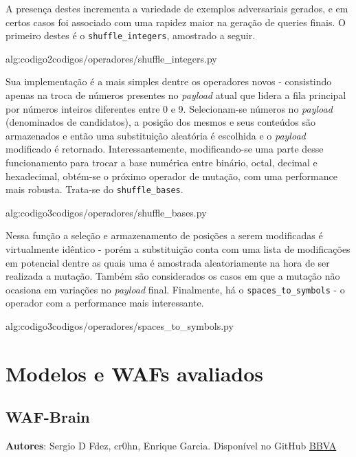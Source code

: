 A presença destes incrementa a variedade de exemplos adversariais gerados, e em certos casos foi associado com uma rapidez maior na geração de queries finais. O primeiro destes é o \verb+shuffle_integers+, amostrado a seguir.

\label{sec:codigos}
 {alg:codigo2}{codigos/operadores/shuffle_integers.py}

\bigskip

Sua implementação é a mais simples dentre os operadores novos - consistindo apenas na troca de números presentes no \textit{payload} atual que lidera a fila principal por números inteiros diferentes entre 0 e 9. Selecionam-se números no \textit{payload} (denominados de candidatos), a posição dos mesmos e seus conteúdos são armazenados e então uma substituição aleatória é escolhida e o \textit{payload} modificado é retornado.  Interessantemente, modificando-se uma parte desse funcionamento para trocar a base numérica entre binário, octal, decimal e hexadecimal, obtém-se o próximo operador de mutação, com uma performance mais robusta. Trata-se do \verb+shuffle_bases+.

\label{sec:codigos}
 {alg:codigo3}{codigos/operadores/shuffle_bases.py}

\bigskip

Nessa função a seleção e armazenamento de posições a serem modificadas é virtualmente idêntico - porém a substituição conta com uma lista de modificações em potencial dentre as quais uma é amostrada aleatoriamente na hora de ser realizada a mutação. Também são considerados os casos em que a mutação não ocasiona em variações no \textit{payload} final. Finalmente, há o \verb+spaces_to_symbols+ - o operador com a performance mais interessante.

\label{sec:codigos}
 {alg:codigo3}{codigos/operadores/spaces_to_symbols.py}

\bigskip


\section{Modelos e WAFs avaliados}

\subsection{WAF-Brain}

\textbf{Autores}: Sergio D Fdez, cr0hn, Enrique Garcia. Disponível no GitHub \href{https://github.com/BBVA}{BBVA}

